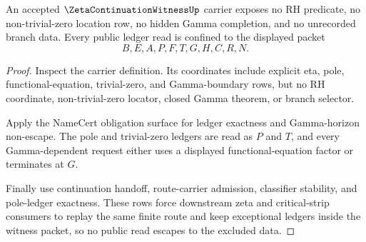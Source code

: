 \begin{theorem}
\label{thm:zeta-continuation-witness-ledger-nonescape-boundary}
An accepted $\ZetaContinuationWitnessUp$ carrier exposes no RH predicate, no non-trivial-zero location row, no hidden Gamma completion, and no unrecorded branch data. Every public ledger read is confined to the displayed packet
$$
B,E,A,P,F,T,G,H,C,R,N.
$$
\end{theorem}
\begin{proof}
Inspect the carrier definition. Its coordinates include explicit eta, pole, functional-equation, trivial-zero, and Gamma-boundary rows, but no RH coordinate, non-trivial-zero locator, closed Gamma theorem, or branch selector.

Apply the NameCert obligation surface for ledger exactness and Gamma-horizon non-escape. The pole and trivial-zero ledgers are read as $P$ and $T$, and every Gamma-dependent request either uses a displayed functional-equation factor or terminates at $G$.

Finally use continuation handoff, route-carrier admission, classifier stability, and pole-ledger exactness. These rows force downstream zeta and critical-strip consumers to replay the same finite route and keep exceptional ledgers inside the witness packet, so no public read escapes to the excluded data.
\end{proof}

